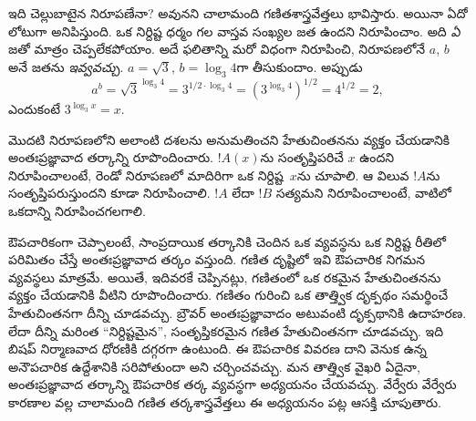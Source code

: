\documentclass[../../../include/open-logic-chapter]{subfiles}
\begin{document}
ఇది చెల్లుబాటైన నిరూపణేనా? అవునని చాలామంది
గణితశాస్త్రవేత్తలు భావిస్తారు. అయినా ఏదో లోటుగా అనిపిస్తుంది. ఒక నిర్దిష్ట
ధర్మం గల వాస్తవ సంఖ్యల జత ఉందని నిరూపించాం.
అది \emph{ఏ} జతో మాత్రం చెప్పలేకపోయాం. అదే ఫలితాన్ని మరో విధంగా
నిరూపించి, నిరూపణలోనే $a$, $b$ అనే జతను \emph{ఇవ్వవచ్చు}.
$a = \sqrt{3}$, $b = \log_3 4$గా తీసుకుందాం. అప్పుడు
\[
a^b = \sqrt{3}^{\log_3 4} = 3^{1/2 \cdot \log_3 4} = (3^{\log_3
  4})^{1/2} = 4^{1/2}= 2,
\]
ఎందుకంటే $3^{\log_3 x} = x$.

మొదటి నిరూపణలోని అలాంటి దశలను అనుమతించని
హేతుచింతనను వ్యక్తం చేయడానికి అంతఃప్రజ్ఞావాద తర్కాన్ని
రూపొందించారు. $!A(x)$ను సంతృప్తిపరిచే $x$ ఉందని
నిరూపించాలంటే, రెండో నిరూపణలో మాదిరిగా ఒక నిర్దిష్ట~$x$ను
చూపాలి. ఆ విలువ $!A$ను సంతృప్తిపరుస్తుందని కూడా
నిరూపించాలి. $!A$ లేదా $!B$ సత్యమని నిరూపించాలంటే,
వాటిలో ఒకదాన్ని నిరూపించగలగాలి.

ఔపచారికంగా చెప్పాలంటే, సాంప్రదాయిక తర్కానికి చెందిన
ఒక  వ్యవస్థను ఒక నిర్దిష్ట రీతిలో
పరిమితం చేస్తే అంతఃప్రజ్ఞావాద తర్కం వస్తుంది. గణిత
దృష్టిలో ఇవి ఔపచారిక నిగమన వ్యవస్థలు మాత్రమే.
అయితే, ఇదివరకే చెప్పినట్లు, గణితంలో ఒక రకమైన
హేతుచింతనను వ్యక్తం చేయడానికి వీటిని రూపొందించారు.
గణితం గురించి ఒక తాత్త్విక దృక్పథం సమర్థించే
హేతుచింతనగా దీన్ని చూడవచ్చు. బ్రౌవర్ అంతఃప్రజ్ఞావాదం
అటువంటి దృక్పథానికి ఉదాహరణ. లేదా దీన్ని మరింత
``నిర్దిష్టమైన'', సంతృప్తికరమైన గణిత హేతుచింతనగా చూడవచ్చు. ఇది బిషప్ నిర్మాణవాద ధోరణికి దగ్గరగా
ఉంటుంది. ఈ ఔపచారిక వివరణ దాని వెనుక ఉన్న
అనౌపచారిక ఉద్దేశానికి సరిపోతుందా అని చర్చించవచ్చు.
మన తాత్త్విక వైఖరి ఏదైనా, అంతఃప్రజ్ఞావాద తర్కాన్ని
ఔపచారిక తర్క వ్యవస్థగా అధ్యయనం చేయవచ్చు. వేర్వేరు
వేర్వేరు కారణాల వల్ల చాలామంది గణిత తర్కశాస్త్రవేత్తలు ఈ
అధ్యయనం పట్ల ఆసక్తి చూపుతారు.
\end{document}
